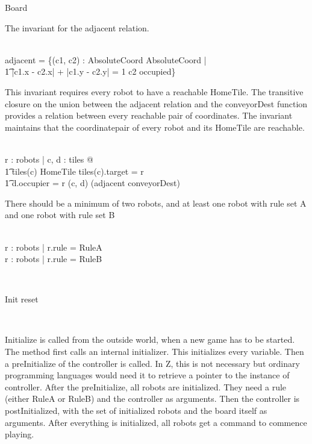 \documentclass[12pt]{article}
\begin{document}
\begin{class}{Board}
\begin{notopstate}
\also \also \also
\begin{zpar}
The invariant for the adjacent relation.
\end{zpar} \\
adjacent = \{(c1, c2) : AbsoluteCoord \times AbsoluteCoord | \\ \t1 |\!c1.x - c2.x\!| + |\!c1.y - c2.y\!| = 1 \wedge c2 \not \in occupied\}
\also \also \also
\begin{zpar}
This invariant requires every robot to have a reachable HomeTile.
The transitive closure on the union between the adjacent relation and the conveyorDest function
provides a relation between every reachable pair of coordinates. The invariant maintains that the coordinatepair of every robot and its HomeTile are reachable.
\end{zpar} \\
\forall r : robots | \exists c, d : \dom tiles @  \\ \t1 tiles(c) \in HomeTile \wedge tiles(c).target = r \; \; \wedge \\ \t1
d.occupier = r \wedge (c, d) \in (adjacent \cup conveyorDest)\star
\also \also \also
\begin{zpar}
There should be a minimum of two robots, and at least one robot with rule set A and one robot with rule set B
\end{zpar} \\
\exists r : \dom robots | r.rule = RuleA \\
\exists r : \dom robots | r.rule = RuleB
\end{notopstate} \\
\begin{schema}{Init}
reset
\end{schema} \\
\znewpage
\begin{zpar}
Initialize is called from the outside world, when a new game has to be
started. The method first calls an internal initializer. This initializes every variable.
Then a preInitialize of the controller is called. In Z, this is not necessary but ordinary programming languages would need it to retrieve a pointer to the instance of controller.
After the preInitialize, all robots are initialized. They need a rule (either RuleA or RuleB) and the controller as arguments.
Then the controller is postInitialized, with the set of initialized robots and the board itself as arguments.
After everything is initialized, all robots get a command to commence playing.
\end{zpar} \\

\end{class}
\end{document}
